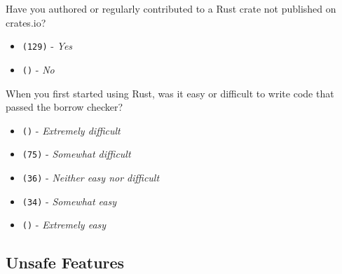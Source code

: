 \begin{protocol}
\item \label{survey:dmq5}  Have you authored or regularly contributed to a Rust crate not published on crates.io?
\begin{itemize}
\item \texttt{(129)} - \textit{Yes}
\item \texttt{()} - \textit{No}
\end{itemize}
\item \label{survey:dmq6}  When you first started using Rust, was it easy or difficult to write code that passed the borrow checker?
\begin{itemize}
\item \texttt{()} - \textit{Extremely difficult}
\item \texttt{(75)} - \textit{Somewhat difficult}
\item \texttt{(36)} - \textit{Neither easy nor difficult}
\item \texttt{(34)} - \textit{Somewhat easy}
\item \texttt{()} - \textit{Extremely easy}
\end{itemize}
\end{protocol}

\subsection{Unsafe Features}
\label{survey:sec:ufq}

